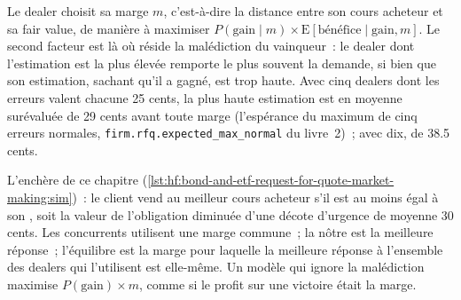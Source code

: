 Le dealer choisit sa marge $m$, c'est-à-dire la distance entre son cours acheteur et sa fair value, de manière à maximiser $P(\text{gain}\mid m)\times\mathrm{E}[\text{bénéfice}\mid
\text{gain},m]$. Le second facteur est là où réside la malédiction du vainqueur~: le dealer dont l'estimation est la plus élevée remporte le plus souvent la demande, si bien que son estimation, sachant
qu'il a gagné, est trop haute. Avec cinq dealers dont les erreurs valent chacune 25 cents, la plus haute estimation est en moyenne surévaluée de 29 cents avant toute marge (l'espérance
du maximum de cinq erreurs normales, \texttt{firm.rfq.expected\_max\_normal} du livre~2)~; avec dix, de 38.5 cents.

L'enchère de ce chapitre (\cref{lst:hf:bond-and-etf-request-for-quote-market-making:sim})~: le client vend au meilleur cours acheteur s'il est au moins égal à son
, soit la valeur de l'obligation diminuée d'une décote d'urgence de moyenne 30 cents. Les concurrents utilisent une marge commune~; la nôtre est la meilleure réponse~;
l'équilibre est la marge pour laquelle la meilleure réponse à l'ensemble des dealers qui l'utilisent est elle-même. Un modèle qui ignore la malédiction maximise $P(\text{gain})\times m$,
comme si le profit sur une victoire était la marge.

